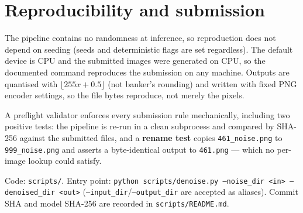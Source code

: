 \section{Reproducibility and submission}

The pipeline contains no randomness at inference, so reproduction does not depend on
seeding (seeds and deterministic flags are set regardless). The default device is CPU
and the submitted images were generated on CPU, so the documented command reproduces
the submission on any machine. Outputs are quantised with $\lfloor 255x+0.5\rfloor$
(not banker's rounding) and written with fixed PNG encoder settings, so the file bytes
reproduce, not merely the pixels.

A preflight validator enforces every submission rule mechanically, including two
positive tests: the pipeline is re-run in a clean subprocess and compared by SHA-256
against the submitted files, and a \textbf{rename test} copies
\texttt{461\_noise.png} to \texttt{999\_noise.png} and asserts a byte-identical output
to \texttt{461.png} --- which no per-image lookup could satisfy.

\vspace{4pt}
\noindent\footnotesize
Code: \texttt{scripts/}. Entry point:
\texttt{python scripts/denoise.py --noise\_dir <in> --denoised\_dir <out>}
(\texttt{--input\_dir}/\texttt{--output\_dir} are accepted as aliases).
Commit SHA and model SHA-256 are recorded in \texttt{scripts/README.md}.

